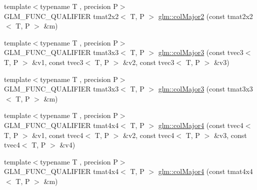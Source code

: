 \begin{DoxyCompactItemize}
\item 
{\footnotesize template$<$typename T , precision P$>$ }\\G\+L\+M\+\_\+\+F\+U\+N\+C\+\_\+\+Q\+U\+A\+L\+I\+F\+I\+E\+R tmat2x2$<$ T, P $>$ \hyperlink{namespaceglm_a57caddbd2a54b700b8c003c2a4db10fc}{glm\+::col\+Major2} (const tmat2x2$<$ T, P $>$ \&m)
\item 
{\footnotesize template$<$typename T , precision P$>$ }\\G\+L\+M\+\_\+\+F\+U\+N\+C\+\_\+\+Q\+U\+A\+L\+I\+F\+I\+E\+R tmat3x3$<$ T, P $>$ \hyperlink{namespaceglm_aadce1b4310b67a3b296ff5a23be451c0}{glm\+::col\+Major3} (const tvec3$<$ T, P $>$ \&v1, const tvec3$<$ T, P $>$ \&v2, const tvec3$<$ T, P $>$ \&v3)
\item 
{\footnotesize template$<$typename T , precision P$>$ }\\G\+L\+M\+\_\+\+F\+U\+N\+C\+\_\+\+Q\+U\+A\+L\+I\+F\+I\+E\+R tmat3x3$<$ T, P $>$ \hyperlink{namespaceglm_a46aacefac38ffd9392731232b7022621}{glm\+::col\+Major3} (const tmat3x3$<$ T, P $>$ \&m)
\item 
{\footnotesize template$<$typename T , precision P$>$ }\\G\+L\+M\+\_\+\+F\+U\+N\+C\+\_\+\+Q\+U\+A\+L\+I\+F\+I\+E\+R tmat4x4$<$ T, P $>$ \hyperlink{namespaceglm_ab71ba69f69c2b3b3b3565fcf150ba315}{glm\+::col\+Major4} (const tvec4$<$ T, P $>$ \&v1, const tvec4$<$ T, P $>$ \&v2, const tvec4$<$ T, P $>$ \&v3, const tvec4$<$ T, P $>$ \&v4)
\item 
{\footnotesize template$<$typename T , precision P$>$ }\\G\+L\+M\+\_\+\+F\+U\+N\+C\+\_\+\+Q\+U\+A\+L\+I\+F\+I\+E\+R tmat4x4$<$ T, P $>$ \hyperlink{namespaceglm_ac787a46bf97e124bda6317ef12bcda89}{glm\+::col\+Major4} (const tmat4x4$<$ T, P $>$ \&m)
\end{DoxyCompactItemize}
